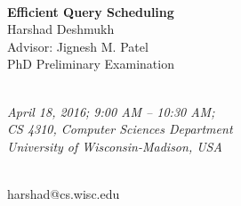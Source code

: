 \documentclass[11pt, oneside]{book}
\newcommand{\cchapter}[1]{\chapter[#1]{\centering #1}}
\begin{document}
\begin{centering}

\vspace*{10ex} \textbf{\LARGE{\\Efficient Query Scheduling}} \LARGE{\\Harshad 
Deshmukh\\Advisor: Jignesh M. Patel}
\LARGE{\\PhD Preliminary Examination}

\textit{\Large{\\April 18, 2016; 9:00 AM -- 10:30 AM;\\CS 4310, Computer
Sciences Department\\University of Wisconsin-Madison, USA}}

\textsf{\Large{\\harshad@cs.wisc.edu}}

\end{centering}

\normalsize

%
%
%
%
%
%
%
%
%
%
%
%
%
%

%
%
\end{document}
